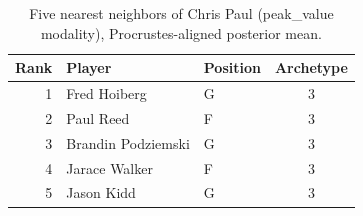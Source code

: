 \begin{table}[htbp]
  \centering\small
  \begin{tabular}{rllc}
    \toprule
    Rank & Player & Position & Archetype \\
    \midrule
    1 & Fred Hoiberg & G & 3 \\
    2 & Paul Reed & F & 3 \\
    3 & Brandin Podziemski & G & 3 \\
    4 & Jarace Walker & F & 3 \\
    5 & Jason Kidd & G & 3 \\
    \bottomrule
  \end{tabular}
  \caption{Five nearest neighbors of Chris Paul (peak_value modality), Procrustes-aligned posterior mean.}
  \label{tab:Chris_Paul_neighbors_peak_value}
\end{table}

